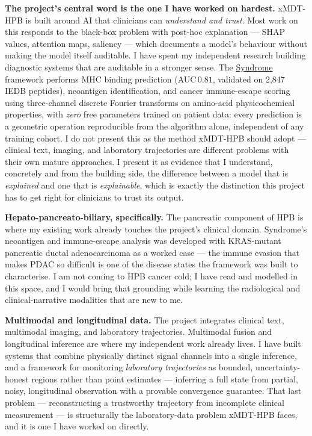 \documentclass[12pt,a4paper]{article}
\begin{document}
\textbf{The project's central word is the one I have worked on hardest.}
xMDT-HPB is built around AI that clinicians can \emph{understand and trust}.
Most work on this responds to the black-box problem with post-hoc explanation
--- SHAP values, attention maps, saliency --- which documents a model's behaviour
without making the model itself auditable.
I have spent my independent research building diagnostic systems that are
auditable in a stronger sense.
The \href{https://syndrome-seven.vercel.app/tools}{Syndrome} framework performs
MHC binding prediction (AUC\,$0.81$, validated on 2{,}847 IEDB peptides),
neoantigen identification, and cancer immune-escape scoring using three-channel
discrete Fourier transforms on amino-acid physicochemical properties, with
\emph{zero} free parameters trained on patient data: every prediction is a
geometric operation reproducible from the algorithm alone, independent of any
training cohort.
I do not present this as the method xMDT-HPB should adopt --- clinical text,
imaging, and laboratory trajectories are different problems with their own
mature approaches.
I present it as evidence that I understand, concretely and from the building
side, the difference between a model that is \emph{explained} and one that is
\emph{explainable}, which is exactly the distinction this project has to get
right for clinicians to trust its output.

\textbf{Hepato-pancreato-biliary, specifically.}
The pancreatic component of HPB is where my existing work already touches the
project's clinical domain.
Syndrome's neoantigen and immune-escape analysis was developed with
KRAS-mutant pancreatic ductal adenocarcinoma as a worked case --- the immune
evasion that makes PDAC so difficult is one of the disease states the framework
was built to characterise.
I am not coming to HPB cancer cold; I have read and modelled in this space,
and I would bring that grounding while learning the radiological and
clinical-narrative modalities that are new to me.

\textbf{Multimodal and longitudinal data.}
The project integrates clinical text, multimodal imaging, and laboratory
trajectories.
Multimodal fusion and longitudinal inference are where my independent work
already lives.
I have built systems that combine physically distinct signal channels into a
single inference, and a framework for monitoring \emph{laboratory trajectories}
as bounded, uncertainty-honest regions rather than point estimates --- inferring
a full state from partial, noisy, longitudinal observation with a provable
convergence guarantee.
That last problem --- reconstructing a trustworthy trajectory from incomplete
clinical measurement --- is structurally the laboratory-data problem xMDT-HPB
faces, and it is one I have worked on directly.
\end{document}
